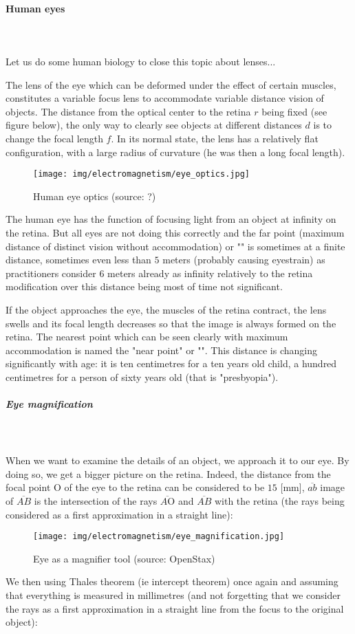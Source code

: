 	
	\pagebreak
	\paragraph{Human eyes}\mbox{}\\\\
	Let us do some human biology to close this topic about lenses...

	The lens of the eye which can be deformed under the effect of certain muscles, constitutes a variable focus lens to accommodate variable distance vision of objects. The distance from the optical center to the retina $r$ being fixed (see figure below), the only way to clearly see objects at different distances $d$ is to change the focal length $f$. In its normal state, the lens has a relatively flat configuration, with a large radius of curvature (he was then a long focal length).
	\begin{figure}[H]
		\centering
		\texttt{[image: img/electromagnetism/eye\_optics.jpg]}
		\caption[Human eye optics]{Human eye optics (source: ?)}
	\end{figure}
	The human eye has the function of focusing light from an object at infinity on the retina. But all eyes are not doing this correctly and the far point (maximum distance of distinct vision without accommodation) or "" is sometimes at a finite distance, sometimes even less than $5$ meters (probably causing eyestrain) as practitioners consider $6$ meters already as infinity relatively to the retina modification over this distance being most of time not significant.
	
	If the object approaches the eye, the muscles of the retina contract, the lens swells and its focal length decreases so that the image is always formed on the retina. The nearest point which can be seen clearly with maximum accommodation is named the "near point" or "". This distance is changing significantly with age: it is ten centimetres for a ten years old child, a hundred centimetres for a person of sixty years old (that is "presbyopia").
	
	\subparagraph{Eye magnification}\mbox{}\\\\
	When we want to examine the details of an object, we approach it to our eye. By doing so, we get a bigger picture on the retina. Indeed, the distance from the focal point O of the eye to the retina can be considered to be $15$ [mm], $\overline{ab}$ image of $\overline{AB}$ is the intersection of the rays $\overline{A\text{O}}$ and $\overline{AB}$ with the retina (the rays being considered as a first approximation in a straight line):
	\begin{figure}[H]
		\centering
		\texttt{[image: img/electromagnetism/eye\_magnification.jpg]}
		\caption[]{Eye as a magnifier tool (source: OpenStax)}
	\end{figure}	
	We then using Thales theorem (ie intercept theorem) once again and assuming that everything is measured in millimetres (and not forgetting that we consider the rays as a first approximation in a straight line from the focus to the original object):
	
